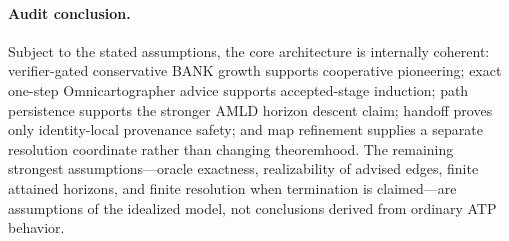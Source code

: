 \documentclass[11pt]{article}
\theoremstyle{remark}
\begin{document}
\paragraph{Audit conclusion.} Subject to the stated assumptions, the core architecture is internally coherent: verifier-gated conservative BANK growth supports cooperative pioneering; exact one-step Omnicartographer advice supports accepted-stage induction; path persistence supports the stronger AMLD horizon descent claim; handoff proves only identity-local provenance safety; and map refinement supplies a separate resolution coordinate rather than changing theoremhood. The remaining strongest assumptions---oracle exactness, realizability of advised edges, finite attained horizons, and finite resolution when termination is claimed---are assumptions of the idealized model, not conclusions derived from ordinary ATP behavior.
\end{document}
